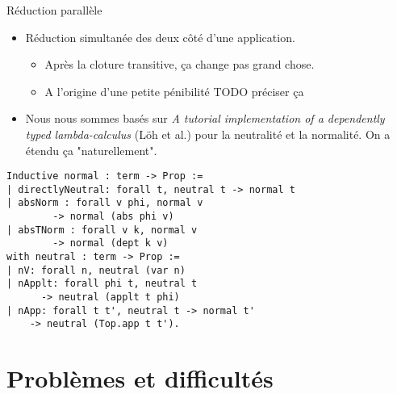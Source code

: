 \documentclass{beamer}
\begin{document}
\begin{frame}{Réduction parallèle}
\begin{itemize}
\item Réduction simultanée des deux côté d'une application.
\begin{itemize}
\item Après la cloture transitive, ça change pas grand chose.
\item A l'origine d'une petite pénibilité TODO préciser ça
\end{itemize}
\pause
\item Nous nous sommes basés sur \emph{A tutorial implementation of a
dependently typed lambda-calculus} (Löh et al.) pour la neutralité et la
normalité. On a étendu ça "naturellement".
\end{itemize}
\end{frame}

\begin{frame}[fragile]
\begin{verbatim}
Inductive normal : term -> Prop :=
| directlyNeutral: forall t, neutral t -> normal t
| absNorm : forall v phi, normal v 
		-> normal (abs phi v)
| absTNorm : forall v k, normal v 
		-> normal (dept k v)
with neutral : term -> Prop :=
| nV: forall n, neutral (var n)
| nApplt: forall phi t, neutral t 
	  -> neutral (applt t phi)
| nApp: forall t t', neutral t -> normal t' 
	-> neutral (Top.app t t').
\end{verbatim}
\end{frame}

\section{Problèmes et difficultés}

\begin{frame}
\end{frame}
\end{document}
